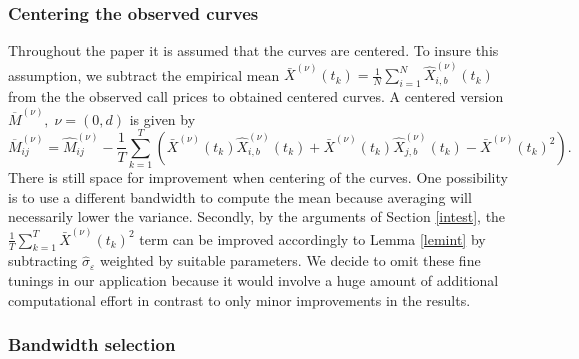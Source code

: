 \subsubsection{Centering the observed curves } %
Throughout the paper it is assumed that the curves are centered. To insure this assumption, we subtract the empirical mean $\bar{X}^{(\nu)}(t_k) = \frac{1}{N} \sum_{i=1}^{N} \hat{X}^{(\nu)}_{i,b}(t_k)$ from the the observed call prices to obtained centered curves. A centered version $\overline{M}^{(\nu)}, \; \nu=(0,d)$ is given by 
\begin{equation}
\label{demean}
\overline{M}^{(\nu)}_{ij} = \hat{M}^{(\nu)}_{ij} - \frac{1}{T} \sum_{k=1}^T\left(  \bar{X}^{(\nu)}(t_k) \hat{X}^{(\nu)}_{i,b}(t_k) +  \bar{X}^{(\nu)}(t_k) \hat{X}^{(\nu)}_{j,b}(t_k) - \bar{X}^{(\nu)}(t_k)^2 \right).
\end{equation}
There is still space for improvement when centering of the curves. One possibility is to use a different bandwidth to compute the mean because averaging will necessarily lower the variance. Secondly, by the arguments of Section \ref{intest}, the $\frac{1}{T} \sum_{k=1}^T \bar{X}^{(\nu)}(t_k)^2$ term can be improved accordingly to Lemma \ref{lemint} by subtracting $\hat{\sigma}_\varepsilon$ weighted by suitable parameters. We decide to omit these fine tunings in our application because it would involve a huge amount of additional computational effort in contrast to only minor improvements in the results. 


\subsubsection{Bandwidth selection}

